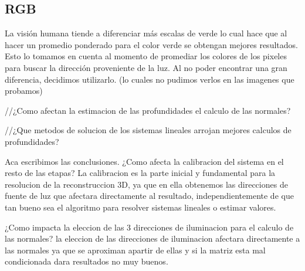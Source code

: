 \subsection{RGB}

\indent La visi\'on humana tiende a diferenciar m\'as escalas de verde lo cual hace que al hacer un promedio ponderado para el color verde se obtengan mejores resultados. Esto lo tomamos en cuenta al momento de promediar los colores de los pixeles para buscar la direcci\'on proveniente de la luz. Al no poder encontrar una gran diferencia, decidimos utilizarlo.
(lo cuales no pudimos verlos en las imagenes que probamos)

//¿Como afectan la estimacion de las profundidades el calculo de las normales?


//¿Que metodos de solucion de los sistemas lineales arrojan mejores calculos de profundidades?

Aca escribimos las conclusiones.
¿Como afecta la calibracion del sistema en el resto de las etapas?
La calibracion es la parte inicial y fundamental para la resolucion de la reconstruccion 3D, ya que en ella obtenemos las direcciones de fuente de luz que afectara directamente al resultado, independientemente de que tan bueno sea el algoritmo para resolver sistemas lineales o estimar valores.

¿Como impacta la eleccion de las 3 direcciones de iluminacion para el calculo de las normales?
la eleccion de las direcciones de iluminacion afectara directamente a las normales ya que se aproximan apartir de ellas y si la matriz esta mal condicionada dara resultados no muy buenos.